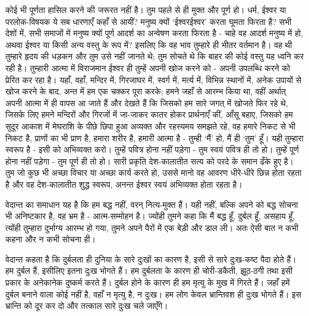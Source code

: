 कोई भी पूर्णता हासिल करने की जरूरत नहीं है। तुम पहले से ही मुक्त और पूर्ण हो। धर्म, ईश्वर या परलोक-विषयक ये सब धारणाएँ कहाँ से आयीं? मनुष्य क्यों ‘ईश्वरईश्वर’ करता घूमता फिरता है? सभी देशों में, सभी समाजों में मनुष्य क्यों पूर्ण आदर्श का अन्वेषण करता फिरता है - चाहे वह आदर्श मनुष्य में हो, अथवा ईश्वर या किसी अन्य वस्तु के रूप में? इसलिए कि वह भाव तुम्हारे ही भीतर वर्तमान है। वह थी तुम्हारे हृदय की धड़कन और तुम उसे नहीं जानते थे; तुम सोचते थे कि बाहर की कोई वस्तु यह ध्वनि कर रही है। तुम्हारी आत्मा में विराजमान ईश्वर ही तुम्हें अपनी खोज करने को - अपनी उपलब्धि करने को प्रेरित कर रहा है। यहाँ, वहाँ, मन्दिर में, गिरजाघर में, स्वर्ग में, मर्त्य में, विभिन्न स्थानों में, अनेक उपायों से खोज करने के बाद, अन्त में हम एक चक्कर पूरा करके; हमने जहाँ से आरम्भ किया था, वहीं अर्थात् अपनी आत्मा में ही वापस आ जाते हैं और देखते हैं कि जिसको हम सारे जगत् में खोजते फिर रहे थे, जिसके लिए हमने मन्दिरों और गिरजों में जा-जाकर कातर होकर प्रार्थनाएँ कीं, आँसू बहाए, जिसको हम सुदूर आकाश में मेघराशि के पीछे छिपा हुआ अव्यक्त और रहस्यमय समझते रहे, वह हमारे निकट से भी निकट है, प्राणों का भी प्राण है, हमारा शरीर है, हमारी आत्मा है - तुम्ही ‘मैं’ हो, मैं ही ‘तुम’ हूँ। यही तुम्हारा स्वरूप है - इसी को अभिव्यक्त करो। तुम्हें पवित्र होना नहीं पड़ेगा - तुम स्वयं पवित्र ही तो हो। तुम्हें पूर्ण होना नहीं पड़ेगा - तुम पूर्ण ही तो हो। सारी प्रकृति देश-कालातीत सत्य को परदे के समान ढँके हुए है। तुम जो कुछ भी अच्छा विचार या अच्छा कार्य करते हो, उससे मानो वह आवरण धीरे-धीरे छिन्न होता रहता है और वह देश-कालातीत शुद्ध स्वरूप, अनन्त ईश्वर स्वयं अभिव्यक्त होता रहता है। 

वेदान्त का समाधान यह है कि हम बद्ध नहीं, वरन् नित्य-मुक्त हैं। यही नहीं, बल्कि अपने को बद्ध सोचना भी अनिष्टकार है, वह भ्रम है - आत्म-सम्मोहन है। ज्योंही तुमने कहा कि मैं बद्ध हूँ, दुर्बल हूँ, असहाय हूँ, त्योंही तुम्हारा दुर्भाग्य आरम्भ हो गया, तुमने अपने पैरों में एक बेड़ी और डाल ली। अतः ऐसी बात न कभी कहना और न कभी सोचना ही। 

वेदान्त कहता है कि दुर्बलता ही दुनिया के सारे दुःखों का कारण है, इसी से सारे दुःख-कष्ट पैदा होते हैं। हम दुर्बल हैं, इसीलिए इतना दुःख भोगते हैं। हम दुर्बलता के कारण ही चोरी-डकैती, झूठ-ठगी तथा इसी प्रकार के अनेकानेक दुष्कर्म करते हैं। दुर्बल होने के कारण ही हम मृत्यु के मुख में गिरते हैं। जहाँ हमें दुर्बल बनाने वाला कोई नहीं है, वहाँ न मृत्यु है, न दुःख। हम लोग केवल भ्रान्तिवश ही दुःख भोगते हैं। इस भ्रान्ति को दूर कर दो और तत्काल सारे दुःख चले जाएँगे। 

